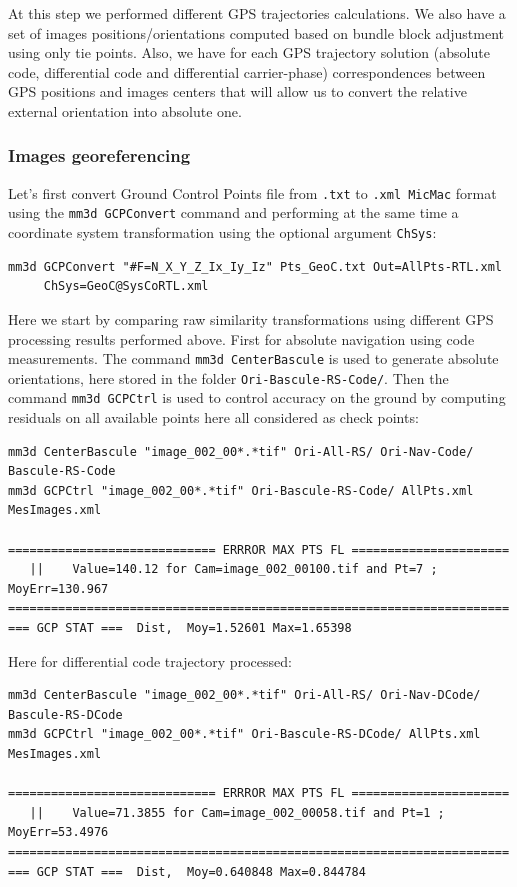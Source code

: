 At this step we performed different GPS trajectories calculations. We also have a set of images positions/orientations computed based on bundle block adjustment using only tie points. Also, we have for each GPS trajectory solution (absolute code, differential code and differential carrier-phase) correspondences between GPS positions and images centers that will allow us to convert the relative external orientation into absolute one.

\subsubsection{Images georeferencing}\label{sec_basc}
Let's first convert Ground Control Points file from {\tt .txt} to {\tt .xml MicMac} format using the {\tt mm3d GCPConvert} command and performing at the same time a coordinate system transformation using the optional argument {\tt ChSys}:

\begin{verbatim}
mm3d GCPConvert "#F=N_X_Y_Z_Ix_Iy_Iz" Pts_GeoC.txt Out=AllPts-RTL.xml 
     ChSys=GeoC@SysCoRTL.xml
\end{verbatim}

Here we start by comparing raw similarity transformations using different GPS processing results performed above. First for absolute navigation using code measurements. The command {\tt mm3d CenterBascule} is used to generate absolute orientations, here stored in the folder {\tt Ori-Bascule-RS-Code/}. Then the command {\tt mm3d GCPCtrl} is used to control accuracy on the ground by computing residuals on all available points here all considered as check points:

\begin{verbatim}
mm3d CenterBascule "image_002_00*.*tif" Ori-All-RS/ Ori-Nav-Code/ Bascule-RS-Code
mm3d GCPCtrl "image_002_00*.*tif" Ori-Bascule-RS-Code/ AllPts.xml MesImages.xml

============================= ERRROR MAX PTS FL ======================
   ||    Value=140.12 for Cam=image_002_00100.tif and Pt=7 ; MoyErr=130.967
======================================================================
=== GCP STAT ===  Dist,  Moy=1.52601 Max=1.65398
\end{verbatim}


Here for differential code trajectory processed:

\begin{verbatim}
mm3d CenterBascule "image_002_00*.*tif" Ori-All-RS/ Ori-Nav-DCode/ Bascule-RS-DCode
mm3d GCPCtrl "image_002_00*.*tif" Ori-Bascule-RS-DCode/ AllPts.xml MesImages.xml

============================= ERRROR MAX PTS FL ======================
   ||    Value=71.3855 for Cam=image_002_00058.tif and Pt=1 ; MoyErr=53.4976
======================================================================
=== GCP STAT ===  Dist,  Moy=0.640848 Max=0.844784
\end{verbatim}

